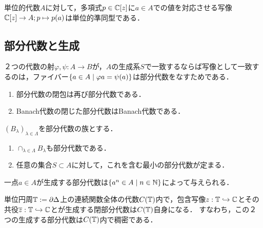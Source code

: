 \documentclass[uplatex,dvipdfmx]{jsreport}
\begin{document}
\begin{example}
    単位的代数$A$に対して，多項式$p\in\mathbb{C}[z]$に$a\in A$での値を対応させる写像$\mathbb{C}[z]\to A;p\mapsto p(a)$は単位的準同型である．
\end{example}

\subsection{部分代数と生成}

\begin{tcolorbox}[colframe=ForestGreen, colback=ForestGreen!10!white,breakable,colbacktitle=ForestGreen!40!white,coltitle=black,fonttitle=\bfseries\sffamily,
title=]
    ２つの代数の射$\varphi,\psi:A\to B$が，$A$の生成系$S$で一致するならば写像として一致するのは，ファイバー$\left\{a\in A\mid\varphi{a}=\psi(a)\right\}$は部分代数をなすためである．
\end{tcolorbox}

\begin{lemma}\mbox{}
    \begin{enumerate}
        \item 部分代数の閉包は再び部分代数である．
        \item Banach代数の閉じた部分代数はBanach代数である．
    \end{enumerate}
\end{lemma}

\begin{lemma}
    $(B_\lambda)_{\lambda\in\Lambda}$を部分代数の族とする．
    \begin{enumerate}
        \item $\cap_{\lambda\in\Lambda}B_\lambda$も部分代数である．
        \item 任意の集合$S\subset A$に対して，これを含む最小の部分代数が定まる．
    \end{enumerate}
\end{lemma}

\begin{example}
    一点$a\in A$が生成する部分代数は$\left\{a^n\in A\mid n\in\mathbb{N}\right\}$によって与えられる．
\end{example}

\begin{example}
    単位円周$\mathbb{T}:=\partial\Delta$上の連続関数全体の代数$C(\mathbb{T})$内で，包含写像$z:\mathbb{T}\hookrightarrow\mathbb{C}$とその共役$\overline{z}:\mathbb{T}\hookrightarrow\mathbb{C}$とが生成する閉部分代数は$C(\mathbb{T})$自身になる．
    すなわち，この２つの生成する部分代数は$C(\mathbb{T})$内で稠密である．
\end{example}
\end{document}
